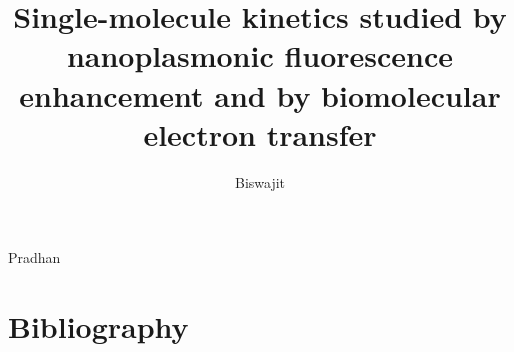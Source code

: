 \documentclass[print]{dissertation}%
\begin{document}
\title[]{Single-molecule kinetics studied by nanoplasmonic fluorescence enhancement and by biomolecular electron transfer}
\author{Biswajit}{Pradhan}

\frontmatter

\tableofcontents
\mainmatter

\thumbtrue





\thumbfalse
\chapter*{Bibliography}






\end{document}
